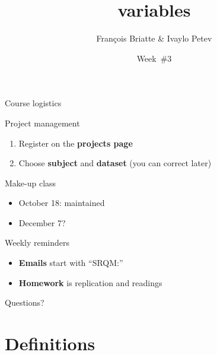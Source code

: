 \documentclass[t]{beamer}
\title{variables}
\author{François Briatte \& Ivaylo Petev}
\date{Week~\#3}
\begin{document}

	\begin{frame}[t]{Course logistics}

    \begin{block}{Project management}
      \begin{enumerate}
        \item Register on the \textbf{projects page}
        \item Choose \textbf{subject} and \textbf{dataset} (you can correct later) 
        
      \end{enumerate}
    \end{block}

   \begin{block}{Make-up class}
\begin{itemize}
\item October 18: maintained
\item December 7?
\end{itemize}

\end{block}

    \begin{alertblock}{Weekly reminders}
      \begin{itemize}
	       \item \textbf{Emails} start with ``SRQM:''
	       \item \textbf{Homework} is replication and readings
      \end{itemize}
    \end{alertblock}
    		
	\end{frame}
\begin{frame}{Questions?}
 
\end{frame}

  
  
	\section{Definitions}
	
\end{document}
